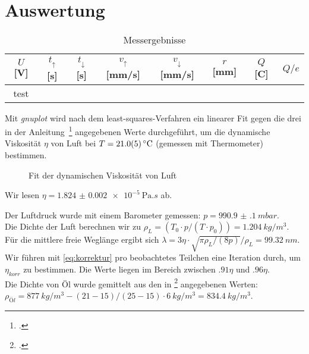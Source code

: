 \section{Auswertung}
\begin{table}
  \centering
  \begin{tabular}{c c c c c c c c} \toprule
    $U$ [\si{V}] & $t_{\uparrow}$ [\si{s}] & $t_{\downarrow}$ [\si{s}] & $v_{\uparrow}$ [\si{mm/s}] & $v_{\downarrow}$ [\si{mm/s}] & $r$ [\si{mm}] & $Q$ [\si{C}] & $Q/e$ \\ \midrule

    test \\ \bottomrule
  \end{tabular}
  \caption{Messergebnisse}
  \label{tab:ergebnisse}
\end{table}
Mit \textit{gnuplot} wird nach dem least-squares-Verfahren ein linearer Fit gegen die drei in der Anleitung~\footcite{anleitung-ws2014} angegebenen Werte durchgeführt, um die dynamische Viskosität $\eta$ von Luft bei $T=\SI{21\pm.5}{\degreeCelsius}$ (gemessen mit Thermometer) bestimmen.
\begin{figure}[H]
  \centering
  \caption{Fit der dynamischen Viskosität von Luft}
  \label{fig:dynviskos}
\end{figure}
Wir lesen $\eta=\SI{1.824(2)e-5}{\pascal.s}$ ab.

Der Luftdruck wurde mit einem Barometer gemessen: $p=\SI{990.9(1)}{mbar}$.\\

Die Dichte der Luft berechnen wir zu $\rho_L=(T_0\cdot p/(T\cdot p_0))=\SI{1.204}{kg/m^3}$.\\

Für die mittlere freie Weglänge ergibt sich $\lambda=3\eta \cdot \sqrt{\pi \rho_L/(8p)}/\rho_L=\SI{99.32}{nm}$. \\

Wir führen mit \cref{eq:korrektur} pro beobachtetes Teilchen eine Iteration durch, um $\eta_{korr}$ zu bestimmen. Die Werte liegen im Bereich zwischen $\num{.91}\eta$ und $\num{.96}\eta$. \\

Die Dichte von Öl wurde gemittelt aus den in \footcite{anleitung-ws2014} angegebenen Werten: $\rho_{Öl}=\SI{877}{kg/m^3}-(21-15)/(25-15)\cdot \SI{6}{kg/m^3}=\SI{834.4}{kg/m^3}$.
